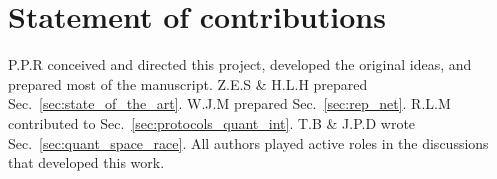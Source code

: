 %
%

\section*{Statement of contributions}

P.P.R conceived and directed this project, developed the original ideas, and prepared most of the manuscript. Z.E.S \& H.L.H prepared Sec.~\ref{sec:state_of_the_art}. W.J.M prepared Sec.~\ref{sec:rep_net}. R.L.M contributed to Sec.~\ref{sec:protocols_quant_int}. T.B \& J.P.D wrote Sec.~\ref{sec:quant_space_race}. All authors played active roles in the discussions that developed this work. 